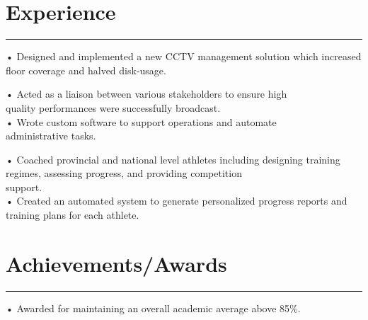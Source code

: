 \documentclass[]{resume}
\begin{document}
\begin{minipage}[t]{0.66\textwidth}
\section{Experience}
\noindent\rule{12.5cm}{0.4pt}
 
\noindent
\hspace{3em}%
\begin{minipage}{0.85\textwidth\vspace{2pt}}
• Designed and implemented a new CCTV management solution which increased floor coverage and halved disk-usage.
\end{minipage}
\sectionsep

 
\noindent
\hspace{3em}%
\begin{minipage}{0.85\textwidth\vspace{2pt}}
• Acted as a liaison between various stakeholders to ensure high\\quality performances were successfully broadcast.\\
• Wrote custom software to support operations and automate\\administrative tasks.
\end{minipage}
\sectionsep

 
\noindent
\hspace{3em}%
\begin{minipage}{0.85\textwidth\vspace{2pt}}
• Coached provincial and national level athletes including designing training regimes, assessing progress, and providing competition\\support.\\
• Created an automated system to generate personalized progress reports and training plans for each athlete.
\end{minipage}
\sectionsep

\section{Achievements/Awards} 
\noindent\rule{12.5cm}{0.4pt}

 
\descript{}
\noindent
\hspace{3em}%
\begin{minipage}{0.85\textwidth\vspace{2pt}}
• Awarded for maintaining an overall academic average above 85\%.
\end{minipage}


\end{minipage}
\end{document}
